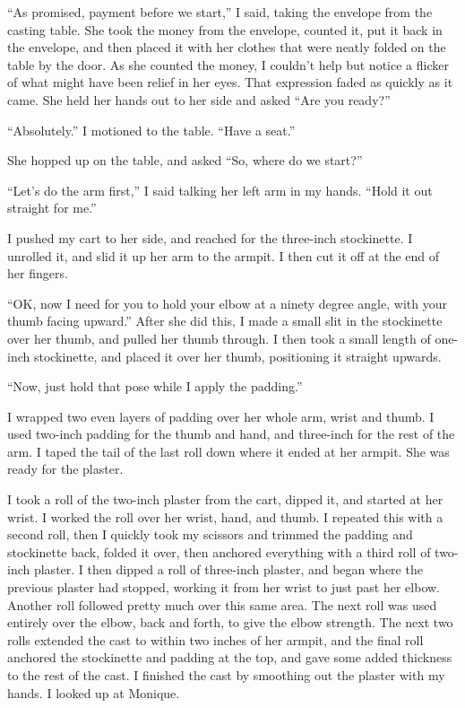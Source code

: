 ``As promised, payment before we start,'' I said, taking the envelope from the casting
table. She took the money from the envelope, counted it, put it back in the envelope, and then
placed it with her clothes that were neatly folded on the table by the door. As she counted the
money, I couldn't help but notice a flicker of what might have been relief in her eyes. That
expression faded as quickly as it came. She held her hands out to her side and asked ``Are you
ready?''

``Absolutely.'' I motioned to the table. ``Have a seat.''

She hopped up on the table, and asked ``So, where do we start?''

``Let's do the arm first,'' I said talking her left arm in my hands. ``Hold it out straight
for me.''

I pushed my cart to her side, and reached for the three-inch stockinette. I unrolled it, and
slid it up her arm to the armpit. I then cut it off at the end of her fingers.

``OK, now I need for you to hold your elbow at a ninety degree angle, with your thumb facing
upward.'' After she did this, I made a small slit in the stockinette over her thumb, and pulled
her thumb through. I then took a small length of one-inch stockinette, and placed it over her
thumb, positioning it straight upwards.

``Now, just hold that pose while I apply the padding.''

I wrapped two even layers of padding over her whole arm, wrist and thumb. I used two-inch
padding for the thumb and hand, and three-inch for the rest of the arm. I taped the tail of the
last roll down where it ended at her armpit. She was ready for the plaster.

I took a roll of the two-inch plaster from the cart, dipped it, and started at her wrist. I
worked the roll over her wrist, hand, and thumb. I repeated this with a second roll, then I
quickly took my scissors and trimmed the padding and stockinette back, folded it over, then
anchored everything with a third roll of two-inch plaster. I then dipped a roll of three-inch
plaster, and began where the previous plaster had stopped, working it from her wrist to just
past her elbow. Another roll followed pretty much over this same area. The next roll was used
entirely over the elbow, back and forth, to give the elbow strength. The next two rolls extended
the cast to within two inches of her armpit, and the final roll anchored the stockinette and
padding at the top, and gave some added thickness to the rest of the cast. I finished the cast
by smoothing out the plaster with my hands. I looked up at Monique.

